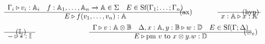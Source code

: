 \begin{figure} [H]
  \small{
\begin{equation*}
\begin{split}
\begin{aligned}
& \hspace{-20pt}
\begin{minipage}[t]{0.3\textwidth}
$\begin{array}{c}
     \Gamma_{i} \triangleright v_{i}: \mathbb{A}_{i} \quad f: \mathbb{A}_{1}, \ldots, \mathbb{A}_{n} \xrightarrow{} \mathbb{A} \in \Sigma \quad E \in \text{Sf}(\Gamma_{1}; \ldots; \Gamma_{n})\\
    \hline
   E \triangleright f( v_{1},\ldots,v_{n}): \mathbb{A}
\end{array}
$
\end{minipage}
\hspace{147pt}
\text{(ax)} 
 \hspace{36pt}
\begin{minipage}[t]{0.3\textwidth}
$\begin{array}{c}
      \\
    \hline
   x:\mathbb{A} \triangleright x:\mathbb{A}
\end{array}
$ \end{minipage}
\hspace{-68pt} \text{(hyp)} \\
& \hspace{-20pt}
\begin{minipage}[t]{0.3\textwidth}
$\begin{array}{c}
    \\
    \hline
   - \triangleright *: \mathbb{I}
\end{array}
$
\end{minipage}
\hspace{-87pt}
\text{($\mathbb{I}_{i}$)} 
 \hspace{90pt}
\begin{minipage}[t]{0.3\textwidth}
$\begin{array}{c}
     \Gamma \triangleright v: \mathbb{A} \otimes \mathbb{B} \quad  \Delta,x: \mathbb{A}, y: \mathbb{B}  \triangleright w: \mathbb{D}  \quad E \in \text{Sf}(\Gamma;\Delta)\\
    \hline
   E\triangleright \text{pm } v \text{ to } x \otimes y. w :\mathbb{D}
\end{array}
$ \end{minipage}
\hspace{117pt} (\otimes_{e}) \\
& \hspace{-20pt}

\end{aligned}
\end{split}
\end{equation*}}
\end{figure}
